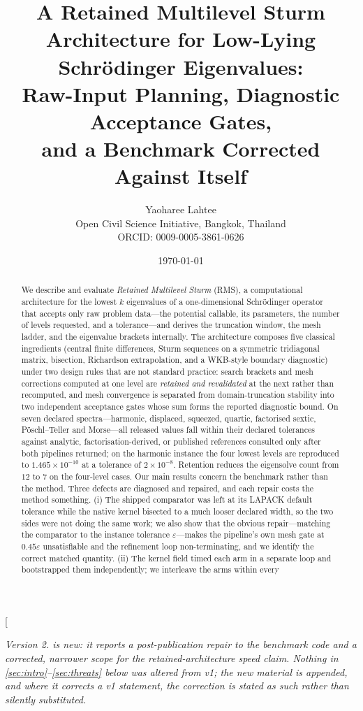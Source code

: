 \documentclass[twocolumn,10pt,a4paper]{article}
\title{\bfseries A Retained Multilevel Sturm Architecture for Low-Lying
Schr\"odinger Eigenvalues:\\[2pt]
Raw-Input Planning, Diagnostic Acceptance Gates,\\ and a Benchmark Corrected Against Itself}
\author{%
Yaoharee Lahtee\\[2pt]
\normalsize Open Civil Science Initiative, Bangkok, Thailand\\
\normalsize ORCID: 0009-0005-3861-0626
}
\date{\today}
\theoremstyle{plain}
\theoremstyle{definition}
\newcommand{\eps}{\varepsilon}
\newcommand{\vtwonote}{\textit{Version 2. \Cref{sec:v2repair} is new: it
reports a post-publication repair to the benchmark code and a corrected,
narrower scope for the retained-architecture speed claim. Nothing in
\cref{sec:intro}--\cref{sec:threats} below was altered from v1; the new
material is appended, and where it corrects a v1 statement, the correction
is stated as such rather than silently substituted.}}
\begin{document}
\twocolumn[
\begin{@twocolumnfalse}
\maketitle
\begin{center}
\vtwonote
\end{center}
\vspace{4pt}
\begin{abstract}
\noindent
We describe and evaluate \emph{Retained Multilevel Sturm} (RMS), a computational
architecture for the lowest $k$ eigenvalues of a one-dimensional Schr\"odinger
operator that accepts only raw problem data---the potential callable, its
parameters, the number of levels requested, and a tolerance---and derives the
truncation window, the mesh ladder, and the eigenvalue brackets internally. The
architecture composes five classical ingredients (central finite differences,
Sturm sequences on a symmetric tridiagonal matrix, bisection, Richardson
extrapolation, and a WKB-style boundary diagnostic) under two design rules that
are not standard practice: search brackets and mesh corrections computed at one
level are \emph{retained and revalidated} at the next rather than recomputed,
and mesh convergence is separated from domain-truncation stability into two
independent acceptance gates whose sum forms the reported diagnostic bound.
On seven declared spectra---harmonic, displaced, squeezed, quartic, factorised
sextic, P\"oschl--Teller and Morse---all released values fall within their
declared tolerances against analytic, factorisation-derived, or published
references consulted only after both pipelines returned; on the harmonic
instance the four lowest levels are reproduced to $1.465\times10^{-10}$ at a
tolerance of $2\times10^{-8}$. Retention reduces the eigensolve count from $12$
to $7$ on the four-level cases.
Our main results concern the benchmark rather than the method. Three defects
are diagnosed and repaired, and each repair costs the method something. (i) The
shipped comparator was left at its LAPACK default tolerance while the native
kernel bisected to a much looser declared width, so the two sides were not doing
the same work; we also show that the obvious repair---matching the comparator to
the instance tolerance $\eps$---makes the pipeline's own mesh gate at $0.45\eps$
unsatisfiable and the refinement loop non-terminating, and we identify the
correct matched quantity. (ii) The kernel field timed each arm in a separate
loop and bootstrapped them independently; we interleave the arms within every

\end{abstract}
\end{@twocolumnfalse}
\end{document}
